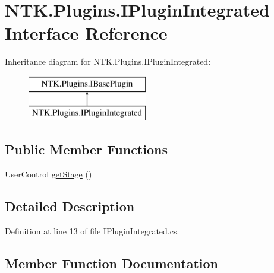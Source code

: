 \hypertarget{interface_n_t_k_1_1_plugins_1_1_i_plugin_integrated}{}\section{N\+T\+K.\+Plugins.\+I\+Plugin\+Integrated Interface Reference}
\label{interface_n_t_k_1_1_plugins_1_1_i_plugin_integrated}


 


Inheritance diagram for N\+T\+K.\+Plugins.\+I\+Plugin\+Integrated\+:\begin{figure}[H]
\begin{center}
\leavevmode
\includegraphics[height=2.000000cm]{da/d9d/interface_n_t_k_1_1_plugins_1_1_i_plugin_integrated}
\end{center}
\end{figure}
\subsection*{Public Member Functions}
\begin{DoxyCompactItemize}
\item 
User\+Control \mbox{\hyperlink{interface_n_t_k_1_1_plugins_1_1_i_plugin_integrated_a61ba7e19bf1c76d0b62b5696fc5e79cb}{get\+Stage}} ()
\end{DoxyCompactItemize}


\subsection{Detailed Description}




Definition at line 13 of file I\+Plugin\+Integrated.\+cs.



\subsection{Member Function Documentation}
\mbox{\label{interface_n_t_k_1_1_plugins_1_1_i_plugin_integrated_a61ba7e19bf1c76d0b62b5696fc5e79cb}} 

